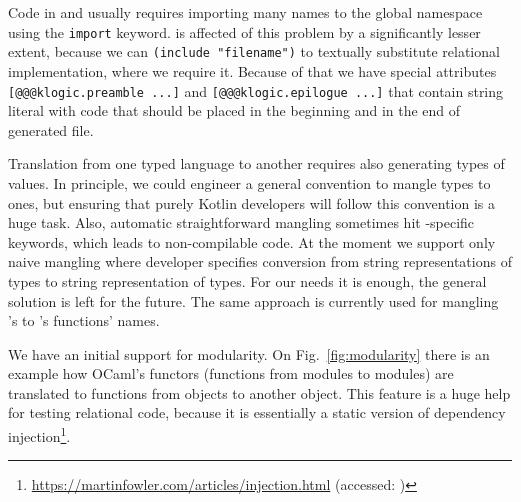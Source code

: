 Code in \Kotlin{} and \Java{} usually requires importing many names to the global namespace using the \verb=import= keyword.
\Scheme{} is affected of this problem by a significantly lesser extent, because we can \verb=(include "filename")= to textually substitute relational implementation, where we require it.
Because of that we have special attributes \verb=[@@@klogic.preamble ...]= and \verb=[@@@klogic.epilogue ...]= that contain string literal with \Kotlin{} code that should be placed in the beginning and in the end of generated file.

Translation from one typed language to another requires also generating types of values.
In principle, we could engineer a general convention to mangle \OCaml{} types to \Kotlin{} ones, but ensuring that purely Kotlin developers will follow this convention is a huge task.
Also, automatic straightforward mangling sometimes hit \Kotlin{}-specific keywords, which leads to non-compilable \Klogic{} code.
At the moment we support only naive mangling where \OCaml{} developer specifies conversion from string representations of \OCaml{} types to string representation of \Klogic{} types.
For our needs it is enough, the general solution is left for the future.
The same approach is currently used for mangling \OCaml{}'s to \Kotlin{}'s functions' names.

We have an initial support for modularity.
On Fig.~\ref{fig:modularity} there is an example how OCaml's functors (functions from modules to modules) are translated to \Kotlin{} functions from objects to another object.
This feature is a huge help for testing relational code, because it is essentially a static version of dependency injection\footnote{\url{https://martinfowler.com/articles/injection.html} (accessed: )}.

